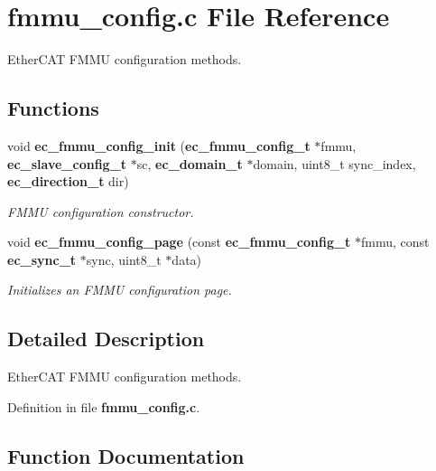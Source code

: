\section{fmmu\-\_\-config.\-c \-File \-Reference}
\label{fmmu__config_8c}


\-Ether\-C\-A\-T \-F\-M\-M\-U configuration methods.  


\subsection*{\-Functions}
\begin{DoxyCompactItemize}
\item 
void {\bf ec\-\_\-fmmu\-\_\-config\-\_\-init} ({\bf ec\-\_\-fmmu\-\_\-config\-\_\-t} $\ast$fmmu, {\bf ec\-\_\-slave\-\_\-config\-\_\-t} $\ast$sc, {\bf ec\-\_\-domain\-\_\-t} $\ast$domain, uint8\-\_\-t sync\-\_\-index, {\bf ec\-\_\-direction\-\_\-t} dir)
\begin{DoxyCompactList}\small\item\em \-F\-M\-M\-U configuration constructor. \end{DoxyCompactList}\item 
void {\bf ec\-\_\-fmmu\-\_\-config\-\_\-page} (const {\bf ec\-\_\-fmmu\-\_\-config\-\_\-t} $\ast$fmmu, const {\bf ec\-\_\-sync\-\_\-t} $\ast$sync, uint8\-\_\-t $\ast$data)
\begin{DoxyCompactList}\small\item\em \-Initializes an \-F\-M\-M\-U configuration page. \end{DoxyCompactList}\end{DoxyCompactItemize}


\subsection{\-Detailed \-Description}
\-Ether\-C\-A\-T \-F\-M\-M\-U configuration methods. 

\-Definition in file {\bf fmmu\-\_\-config.\-c}.



\subsection{\-Function \-Documentation}
